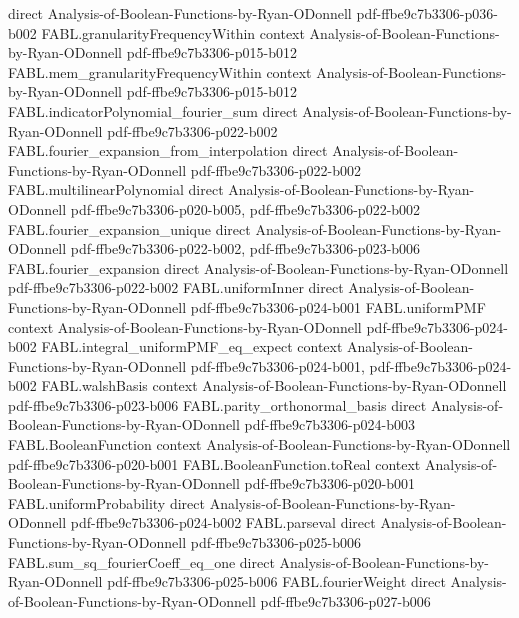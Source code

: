 \begin{theorem}
  {direct}
  {Analysis-of-Boolean-Functions-by-Ryan-ODonnell}
  {pdf-ffbe9c7b3306-p036-b002}
\proofstep
  {FABL.granularityFrequencyWithin}
  {context}
  {Analysis-of-Boolean-Functions-by-Ryan-ODonnell}
  {pdf-ffbe9c7b3306-p015-b012}
\proofstep
  {FABL.mem_granularityFrequencyWithin}
  {context}
  {Analysis-of-Boolean-Functions-by-Ryan-ODonnell}
  {pdf-ffbe9c7b3306-p015-b012}
\proofstep
  {FABL.indicatorPolynomial_fourier_sum}
  {direct}
  {Analysis-of-Boolean-Functions-by-Ryan-ODonnell}
  {pdf-ffbe9c7b3306-p022-b002}
\proofstep
  {FABL.fourier_expansion_from_interpolation}
  {direct}
  {Analysis-of-Boolean-Functions-by-Ryan-ODonnell}
  {pdf-ffbe9c7b3306-p022-b002}
\proofstep
  {FABL.multilinearPolynomial}
  {direct}
  {Analysis-of-Boolean-Functions-by-Ryan-ODonnell}
  {pdf-ffbe9c7b3306-p020-b005,
    pdf-ffbe9c7b3306-p022-b002}
\proofstep
  {FABL.fourier_expansion_unique}
  {direct}
  {Analysis-of-Boolean-Functions-by-Ryan-ODonnell}
  {pdf-ffbe9c7b3306-p022-b002,
    pdf-ffbe9c7b3306-p023-b006}
\proofstep
  {FABL.fourier_expansion}
  {direct}
  {Analysis-of-Boolean-Functions-by-Ryan-ODonnell}
  {pdf-ffbe9c7b3306-p022-b002}
\proofstep
  {FABL.uniformInner}
  {direct}
  {Analysis-of-Boolean-Functions-by-Ryan-ODonnell}
  {pdf-ffbe9c7b3306-p024-b001}
\proofstep
  {FABL.uniformPMF}
  {context}
  {Analysis-of-Boolean-Functions-by-Ryan-ODonnell}
  {pdf-ffbe9c7b3306-p024-b002}
\proofstep
  {FABL.integral_uniformPMF_eq_expect}
  {context}
  {Analysis-of-Boolean-Functions-by-Ryan-ODonnell}
  {pdf-ffbe9c7b3306-p024-b001,
    pdf-ffbe9c7b3306-p024-b002}
\proofstep
  {FABL.walshBasis}
  {context}
  {Analysis-of-Boolean-Functions-by-Ryan-ODonnell}
  {pdf-ffbe9c7b3306-p023-b006}
\proofstep
  {FABL.parity_orthonormal_basis}
  {direct}
  {Analysis-of-Boolean-Functions-by-Ryan-ODonnell}
  {pdf-ffbe9c7b3306-p024-b003}
\proofstep
  {FABL.BooleanFunction}
  {context}
  {Analysis-of-Boolean-Functions-by-Ryan-ODonnell}
  {pdf-ffbe9c7b3306-p020-b001}
\proofstep
  {FABL.BooleanFunction.toReal}
  {context}
  {Analysis-of-Boolean-Functions-by-Ryan-ODonnell}
  {pdf-ffbe9c7b3306-p020-b001}
\proofstep
  {FABL.uniformProbability}
  {direct}
  {Analysis-of-Boolean-Functions-by-Ryan-ODonnell}
  {pdf-ffbe9c7b3306-p024-b002}
\proofstep
  {FABL.parseval}
  {direct}
  {Analysis-of-Boolean-Functions-by-Ryan-ODonnell}
  {pdf-ffbe9c7b3306-p025-b006}
\proofstep
  {FABL.sum_sq_fourierCoeff_eq_one}
  {direct}
  {Analysis-of-Boolean-Functions-by-Ryan-ODonnell}
  {pdf-ffbe9c7b3306-p025-b006}
\proofstep
  {FABL.fourierWeight}
  {direct}
  {Analysis-of-Boolean-Functions-by-Ryan-ODonnell}
  {pdf-ffbe9c7b3306-p027-b006}

\end{theorem}
